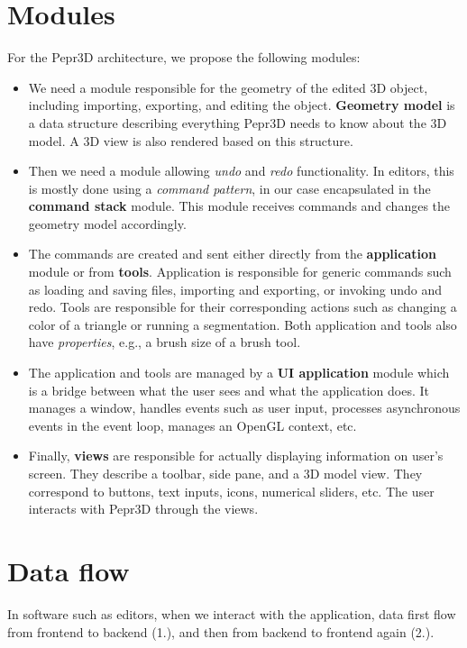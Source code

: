 \section{Modules}

For the Pepr3D architecture, we propose the following modules:
%
\begin{itemize}
\item We need a module responsible for the geometry of the edited 3D object, including importing, exporting, and editing the object.
      \textbf{Geometry model} is a data structure describing everything Pepr3D needs to know about the 3D model.
      A 3D view is also rendered based on this structure.
\item Then we need a module allowing \emph{undo} and \emph{redo} functionality.
      In editors, this is mostly done using a \emph{command pattern}, in our case encapsulated in the \textbf{command stack} module.
      This module receives commands and changes the geometry model accordingly.
\item The commands are created and sent either directly from the \textbf{application} module or from \textbf{tools}.
      Application is responsible for generic commands such as loading and saving files, importing and exporting, or invoking undo and redo.
      Tools are responsible for their corresponding actions such as changing a color of a triangle or running a segmentation.
      Both application and tools also have \emph{properties}, e.g., a brush size of a brush tool.
\item The application and tools are managed by a \textbf{UI application} module which is a bridge between what the user sees and what the application does.
      It manages a window, handles events such as user input, processes asynchronous events in the event loop, manages an OpenGL context, etc.
\item Finally, \textbf{views} are responsible for actually displaying information on user's screen.
      They describe a toolbar, side pane, and a 3D model view.
      They correspond to buttons, text inputs, icons, numerical sliders, etc.
      The user interacts with Pepr3D through the views.
\end{itemize}

\section{Data flow}

In software such as editors, when we interact with the application, data first flow from frontend to backend (1.), and then from backend to frontend again (2.).


